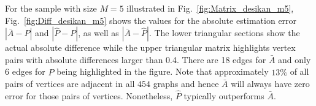 \documentclass[journal,twoside,web]{ieeecolor}
\begin{document}


For the sample with size $M=5$ illustrated in Fig.~\ref{fig:Matrix_desikan_m5}, Fig.~\ref{fig:Diff_desikan_m5} shows the values for the absolute estimation error $|\bar{A} - P|$ and $|\hat{P}-P|$, as well as $|\bar{A} - \hat{P}|$.
The lower triangular sections show the actual absolute difference while the upper triangular matrix highlights vertex pairs with absolute differences larger than 0.4.
There are 18 edges for $\bar{A}$ and only 6 edges for $\hat{P}$ being highlighted in the figure.
Note that approximately $13\%$ of all pairs of vertices are adjacent in all $454$ graphs and hence $\bar{A}$ will always have zero error for those pairs of vertices.
Nonetheless, $\hat{P}$ typically outperforms $\bar{A}$.
\end{document}
